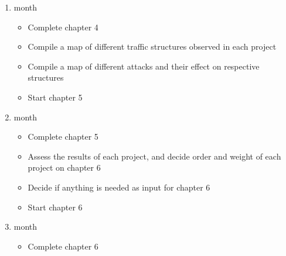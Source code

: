 \documentclass[a4paper,12pt,twoside]{article}
\begin{document}
\begin{enumerate}
\item month
\begin{itemize}
\item Complete chapter 4
\item Compile a map of different traffic structures observed in each project
\item Compile a map of different attacks and their effect on respective structures
\item Start chapter 5

\end{itemize}
\item month
\begin{itemize}
\item Complete chapter 5
\item Assess the results of each project, and decide order and weight of each project on chapter 6
\item Decide if anything is needed as input for chapter 6
\item Start chapter 6
\end{itemize}

\item month
\begin{itemize}
\item Complete chapter 6
\end{itemize}
\end{enumerate}





\end{document}
